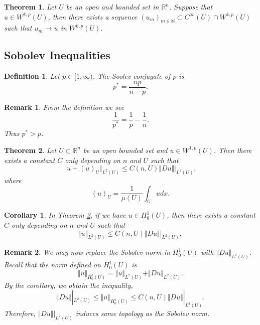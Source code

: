 \documentclass{article}
\newtheorem{theorem}{Theorem}[section]
\newtheorem{definition}{Definition}[section]
\newtheorem{remark}{Remark}[section]
\newtheorem{corollary}{Corollary}[section]
\numberwithin{equation}{section}
\begin{document}
\begin{theorem}
Let $U$ be an open and bounded set in $\mathbb{R}^n$. Suppose that $u\in W^{k,p}(U)$, then there exists a sequence $(u_m)_{m\in\mathbb{N}}\subset C^\infty(U)\cap W^{k,p}(U)$ such that $u_m\to u$ in $W^{k,p}(U)$. 
\end{theorem}

\subsection{Sobolev Inequalities}

\begin{definition}
Let $p\in[1,\infty)$. The Soolev conjugate of $p$ is 
\begin{equation*}
p^* = {\frac {np} {n-p}}.
\end{equation*} 
\end{definition}

\begin{remark}
From the definition we see 
\begin{equation*}
{\frac 1 {p^*}} = {\frac 1 p}-{\frac 1 n}.
\end{equation*}
Thus $p^*>p$.
\end{remark}

\begin{theorem}
\label{poincare_ineq}
Let $U\subset \mathbb{R}^n$ be an open bounded set and $u\in W^{1,p}(U)$. Then there exists a constant $C$ only depending on $n$ and $U$ such that
\begin{equation*}
\Vert u - (u)_U\Vert_{L^2(U)}\leq C(n,U)\Vert Du\Vert|_{L^2(U)},
\end{equation*}
where 
\begin{equation*}
(u)_U={\frac 1 {\mu(U)}}\int_U udx.
\end{equation*}
\end{theorem}

\begin{corollary}
In Theorem \ref{poincare_ineq}, if we have $u\in H_0^1(U)$, then there exists a constant $C$ only depending on $n$ and $U$ such that
\begin{equation*}
\Vert u \Vert_{L^2(U)}\leq C(n,U)\Vert Du\Vert|_{L^2(U)},
\end{equation*}
\end{corollary}

\begin{remark}
We may now replace the Sobolev norm in $H^1_0(U)$ with $\Vert Du\Vert_{L^2(U)}$. Recall that the norm defined on $H^1_0(U)$ is 
\begin{equation*}
\Vert u\Vert_{H^1_0(U)} = \Vert u\Vert_{L^2(U)}+\Vert Du\Vert_{L^2(U)}.
\end{equation*}
By the corollary, we obtain the inequality,
\begin{equation*}
\Vert Du\Vert|_{L^2(U)}\leq\Vert u\Vert_{H^1_0(U)} \leq C(n,U)\Vert Du\Vert|_{L^2(U)}.
\end{equation*}
Therefore, $\Vert Du\Vert|_{L^2(U)}$ induces same topology as the Sobolev norm.
\end{remark}
\end{document}
